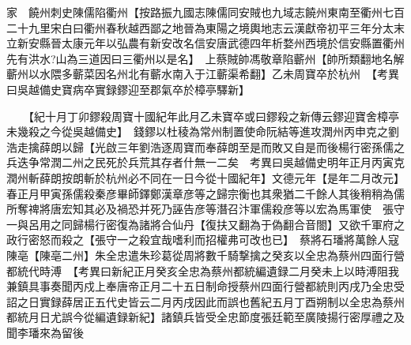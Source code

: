 家　饒州刺史陳儒陷衢州【按路振九國志陳儒同安賊也九域志饒州東南至衢州七百二十九里宋白曰衢州春秋越西鄙之地晉為東陽之境輿地志云漢獻帝初平三年分太末立新安縣晉太康元年以弘農有新安改名信安唐武德四年析婺州西境於信安縣置衢州先有洪水?山為三道因曰三衢州以是名】　上蔡賊帥馮敬章陷蘄州【帥所類翻地名解蘄州以水隈多蘄菜因名州北有蘄水南入于江蘄渠希翻】乙未周寶卒於杭州　【考異曰吳越備史寶病卒實録鏐迎至郡氣卒於樟亭驛新】

　　【紀十月丁卯鏐殺周寶十國紀年此月乙未寶卒或曰鏐殺之新傳云鏐迎寶舍樟亭未幾殺之今從吳越備史】　錢鏐以杜稜為常州制置使命阮結等進攻潤州丙申克之劉浩走擒薛朗以歸【光啟三年劉浩逐周寶而奉薛朗至是而敗又自是而後楊行密孫儒之兵迭争常潤二州之民死於兵荒其存者什無一二矣　考異曰吳越備史明年正月丙寅克潤州斬薛朗按朗斬於杭州必不同在一日今從十國紀年】文德元年【是年二月改元】春正月甲寅孫儒殺秦彦畢師鐸鄭漢章彦等之歸宗衡也其衆猶二千餘人其後稍稍為儒所奪禆將唐宏知其必及禍恐并死乃誣告彦等潛召汴軍儒殺彦等以宏為馬軍使　張守一與呂用之同歸楊行密復為諸將合仙丹【復扶又翻為于偽翻合音閤】又欲千軍府之政行密怒而殺之【張守一之殺宜哉嗜利而招權弗可改也已】　蔡將石璠將萬餘人寇陳亳【陳亳二州】朱全忠遣朱珍葛從周將數千騎撃擒之癸亥以全忠為蔡州四面行營都統代時溥　【考異曰新紀正月癸亥全忠為蔡州都統編遺録二月癸未上以時溥阻我兼鎮具事奏聞丙戍上奉唐帝正月二十五日制命授蔡州四面行營都統則丙戌乃全忠受詔之日實録薛居正五代史皆云二月丙戌因此而誤也舊紀五月丁酉朔制以全忠為蔡州都統月日尤誤今從編遺録新紀】諸鎮兵皆受全忠節度張廷範至廣陵揚行密厚禮之及聞李璠來為留後

